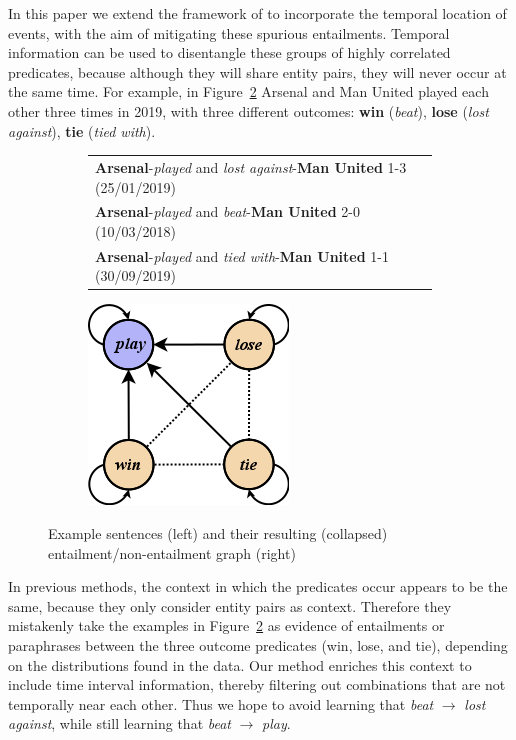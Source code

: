 \documentclass[11pt]{article}
\begin{document}
In this paper we extend the framework of  to incorporate the temporal location of events, with the aim of mitigating these spurious entailments. Temporal information can be used to disentangle these groups of highly correlated predicates, because although they will share entity pairs, they will never occur at the same time. For example, in Figure~\ref{fig:example} Arsenal and Man United played each other three times in 2019, with three different outcomes: \textbf{win} (\textit{beat}), \textbf{lose} (\textit{lost against}), \textbf{tie} (\textit{tied with}).


\begin{figure}[h!]
\begin{subfigure}[]{.7\linewidth}
\begin{tabular}{l}
\textbf{Arsenal}-\textit{played} and \textit{lost against}-\textbf{Man United} 1-3 (25/01/2019)\\
\textbf{Arsenal}-\textit{played} and \textit{beat}-\textbf{Man United} 2-0 (10/03/2018)\\
\textbf{Arsenal}-\textit{played} and \textit{tied with}-\textbf{Man United} 1-1 (30/09/2019) \\
\end{tabular}
\end{subfigure}%
\begin{subfigure}[]{.3\linewidth}
\centering
\includegraphics[scale=0.6]{win-play-lose-tie.png}
\label{fig:example-entailments}
\end{subfigure}
\caption{Example sentences (left) and their resulting (collapsed) entailment/non-entailment graph (right)}
\label{fig:example}
\end{figure}


In previous methods, the context in which the predicates occur appears to be the same, because they only consider entity pairs as context. Therefore they mistakenly take the examples in Figure~\ref{fig:example} as evidence of entailments or paraphrases between the three outcome predicates (win, lose, and tie), depending on the distributions found in the data. Our method enriches this context to include time interval information, thereby filtering out combinations that are not temporally near each other. Thus we hope to avoid learning that \textit{beat} $\rightarrow$ \textit{lost against}, while still learning that \textit{beat} $\rightarrow$ \textit{play}.
 
\end{document}
